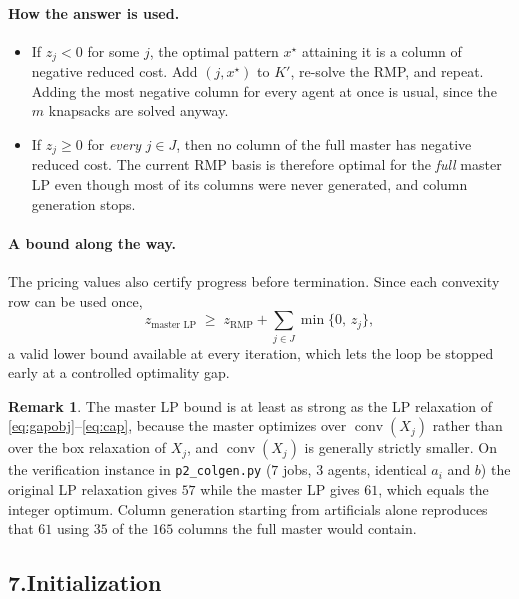 \documentclass[11pt]{article}
\DeclareMathOperator{\conv}{conv}
\theoremstyle{definition}
\newtheorem{remark}{Remark}
\theoremstyle{plain}
\begin{document}
\paragraph{How the answer is used.}
\begin{itemize}
  \item If $z_j < 0$ for some $j$, the optimal pattern $x^\star$
        attaining it is a column of negative reduced cost. Add
        $(j, x^\star)$ to $K'$, re-solve the RMP, and repeat. Adding the
        most negative column for every agent at once is usual, since the
        $m$ knapsacks are solved anyway.
  \item If $z_j \ge 0$ for \emph{every} $j \in J$, then no column of the
        full master has negative reduced cost. The current RMP basis is
        therefore optimal for the \emph{full} master LP even though most
        of its columns were never generated, and column generation
        stops.
\end{itemize}

\paragraph{A bound along the way.} The pricing values also certify
progress before termination. Since each convexity row can be used once,
\[
  z_{\text{master LP}} \;\ge\; z_{\text{RMP}}
    + \sum_{j \in J} \min\{0,\, z_j\},
\]
a valid lower bound available at every iteration, which lets the loop be
stopped early at a controlled optimality gap.

\begin{remark}
The master LP bound is at least as strong as the LP relaxation of
\eqref{eq:gapobj}--\eqref{eq:cap}, because the master optimizes over
$\conv(X_j)$ rather than over the box relaxation of $X_j$, and
$\conv(X_j)$ is generally strictly smaller. On the verification instance
in \texttt{p2\_colgen.py} ($7$ jobs, $3$ agents, identical $a_i$ and
$b$) the original LP relaxation gives $57$ while the master LP gives
$61$, which equals the integer optimum. Column generation starting from
artificials alone reproduces that $61$ using $35$ of the $165$ columns
the full master would contain.
\end{remark}

\subsection*{7.\quad Initialization}
\end{document}
